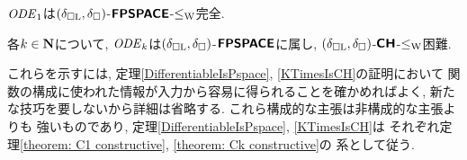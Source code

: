 \begin{theorem}
\label{theorem: C1 constructive}
$\mathit{ODE} _1$は$(\delta _{\square \mathrm L}, \delta _\square)$-$\text{\bfseries \sffamily \upshape FPSPACE}$-$\leq _{\mathrm W}$完全. 
\end{theorem}

\begin{theorem}
\label{theorem: Ck constructive}
各$k \in \mathbf N$について, 
$\mathit{ODE} _k$は$(\delta _{\square \mathrm L}, \delta _\square)$-$\text{\bfseries \sffamily \upshape FPSPACE}$に属し, 
$(\delta _{\square \mathrm L}, \delta _\square)$-$\text{\bfseries \sffamily \upshape CH}$-$\leq _{\mathrm W}$困難. 
\end{theorem}

これらを示すには, 
定理\ref{DifferentiableIsPspace}, \ref{KTimesIsCH}の証明において
関数の構成に使われた情報が入力から容易に得られることを確かめればよく, 
新たな技巧を要しないから詳細は省略する. 
これら構成的な主張は非構成的な主張よりも
強いものであり\cite[Lemmas 3.7, 3.8]{kawamura2010operators}, 
定理\ref{DifferentiableIsPspace}, \ref{KTimesIsCH}は
それぞれ定理\ref{theorem: C1 constructive}, \ref{theorem: Ck constructive}の
系として従う. 


